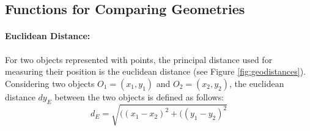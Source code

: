 \subsection{Functions for Comparing Geometries}
\paragraph{Euclidean Distance:}
For two objects represented with points, the principal distance used  for measuring their position is the euclidean distance (see Figure \ref{fig:geodistances}). Considering two objects $O_{1} = (x_{1}, y_{1})$ and $O_{2} = (x_{2}, y_{2})$, the euclidean distance $dy_{E}$ between the two objects is defined as follows:
\begin{equation}
d_{E} = \sqrt{((x_{1} - x_{2})^2 + ((y_{1} - y_{2})^2}
\end{equation}


\begin{figure}[ht!b]
\end{figure}


